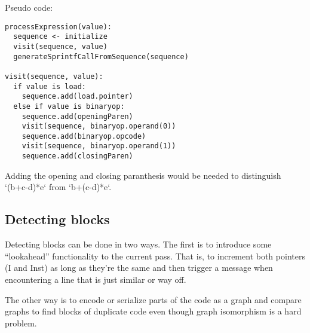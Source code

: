 \documentclass[a4paper,11pt]{article}
\theoremstyle{mytheor}
\begin{document}
Pseudo code:

\begin{verbatim}
processExpression(value):
  sequence <- initialize
  visit(sequence, value)
  generateSprintfCallFromSequence(sequence)

visit(sequence, value):
  if value is load:
    sequence.add(load.pointer)
  else if value is binaryop:
    sequence.add(openingParen)
    visit(sequence, binaryop.operand(0))
    sequence.add(binaryop.opcode)
    visit(sequence, binaryop.operand(1))
    sequence.add(closingParen)
\end{verbatim}

Adding the opening and closing paranthesis would be needed to distinguish `(b+c-d)*e` from `b+(c-d)*e`.

\subsection*{Detecting blocks}
Detecting blocks can be done in two ways.
The first is to introduce some ``lookahead'' functionality to the current pass. That is, to increment both pointers (I and Inst) as long as they're the same and then trigger a message when encountering a line that is just similar or way off.

The other way is to encode or serialize parts of the code as a graph and compare graphs to find blocks of duplicate code even though graph isomorphism is a hard problem.
\end{document}
